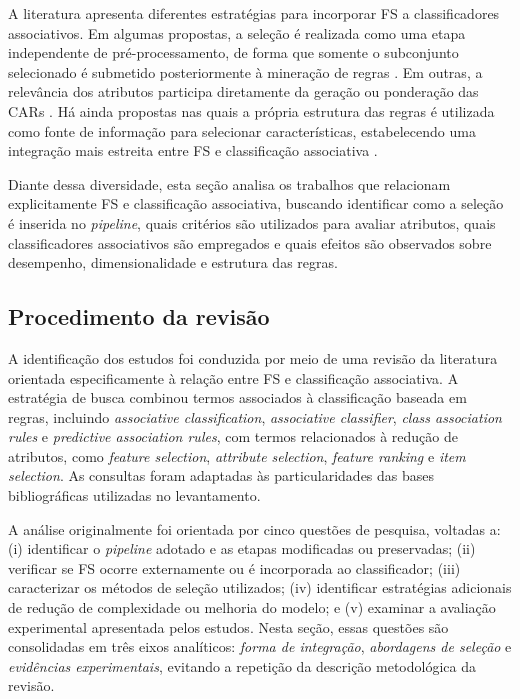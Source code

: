 A literatura apresenta diferentes estratégias para incorporar FS a
classificadores associativos. Em algumas propostas, a seleção é realizada como
uma etapa independente de pré-processamento, de forma que somente o subconjunto
selecionado é submetido posteriormente à mineração de regras
. Em outras, a relevância dos atributos participa
diretamente da geração ou ponderação das CARs
. Há ainda propostas nas quais
a própria estrutura das regras é utilizada como fonte de informação para
selecionar características, estabelecendo uma integração mais estreita entre
FS e classificação associativa .

Diante dessa diversidade, esta seção analisa os trabalhos que relacionam
explicitamente FS e classificação associativa, buscando identificar como a
seleção é inserida no \textit{pipeline}, quais critérios são utilizados para
avaliar atributos, quais classificadores associativos são empregados e quais
efeitos são observados sobre desempenho, dimensionalidade e estrutura das
regras.

\subsection{Procedimento da revisão}
\label{subsec:procedimento-rsl-ca}

A identificação dos estudos foi conduzida por meio de uma revisão da literatura
orientada especificamente à relação entre FS e classificação associativa. A
estratégia de busca combinou termos associados à classificação baseada em regras,
incluindo \textit{associative classification}, \textit{associative classifier},
\textit{class association rules} e \textit{predictive association rules}, com
termos relacionados à redução de atributos, como \textit{feature selection},
\textit{attribute selection}, \textit{feature ranking} e \textit{item
selection}. As consultas foram adaptadas às particularidades das bases
bibliográficas utilizadas no levantamento.

A análise originalmente foi orientada por cinco questões de pesquisa, voltadas
a: (i) identificar o \textit{pipeline} adotado e as etapas modificadas ou
preservadas; (ii) verificar se FS ocorre externamente ou é incorporada ao
classificador; (iii) caracterizar os métodos de seleção utilizados; (iv)
identificar estratégias adicionais de redução de complexidade ou melhoria do
modelo; e (v) examinar a avaliação experimental apresentada pelos estudos.
Nesta seção, essas questões são consolidadas em três eixos analíticos:
\textit{forma de integração}, \textit{abordagens de seleção} e
\textit{evidências experimentais}, evitando a repetição da descrição
metodológica da revisão.

